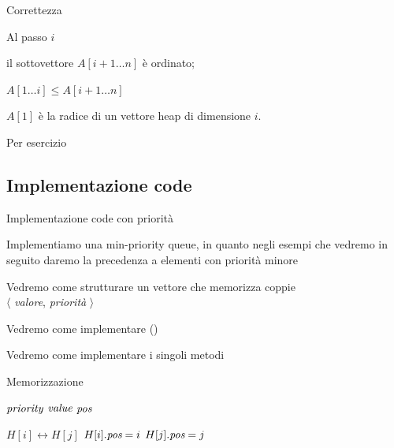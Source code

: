 \begin{frame}{Correttezza}
    
\smallskip
Al passo $i$
\BIL
\item il sottovettore $A[i+1 \ldots n]$ è ordinato; 
\item $A[1 \ldots i] \leq A[i+1 \ldots n]$ 
\item $A[1]$ è la radice di un vettore heap di dimensione $i$.
\EIL

\smallskip
Per esercizio

\end{frame}


\subsection{Implementazione code}

\begin{frame}{Implementazione code con priorità}

Implementiamo una min-priority queue, in quanto negli esempi che vedremo
in seguito daremo la precedenza a elementi con priorità minore

\BIL
\item Vedremo come strutturare un vettore che memorizza coppie\\
  $\langle$ \textit{valore}, \textit{priorità} $\rangle$
\item Vedremo come implementare \minheapify()
\item Vedremo come implementare i singoli metodi
\EIL

\end{frame}

\begin{frame}{Memorizzazione}

\begin{Procedure}
\caption[A]{\PriorityItem}

\INTEGER $\textit{priority}$
\Item $\textit{value}$
\INTEGER $\textit{pos}$

\end{Procedure}

\begin{Procedure}
\caption[A]{\Swap($\PriorityItem[\,]$ $H$, \INTEGER $i$, \INTEGER $j$)}

$H[i] \leftrightarrow H[j]$\;
$H[i].\textit{pos} = i$\;
$H[j].\textit{pos} = j$\;

\end{Procedure}

\end{frame}

